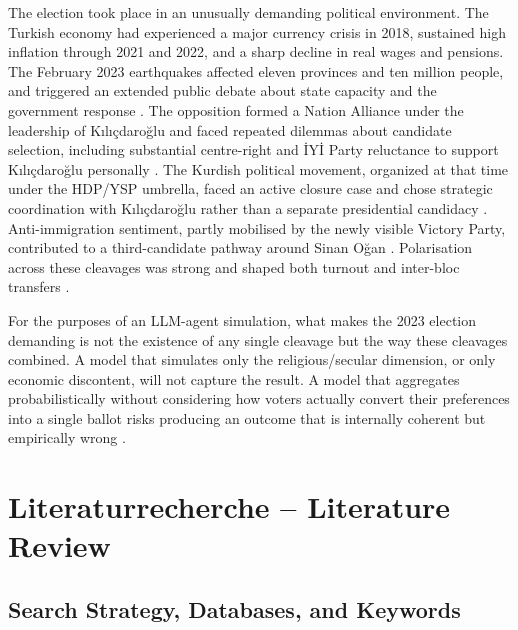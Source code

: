\documentclass[12pt,a4paper]{report}
\begin{document}
The election took place in an unusually demanding political environment. The Turkish economy had experienced a major currency crisis in 2018, sustained high inflation through 2021 and 2022, and a sharp decline in real wages and pensions. The February 2023 earthquakes affected eleven provinces and ten million people, and triggered an extended public debate about state capacity and the government response \citep{sevinc2024afet}. The opposition formed a Nation Alliance under the leadership of Kılıçdaroğlu and faced repeated dilemmas about candidate selection, including substantial centre-right and İYİ Party reluctance to support Kılıçdaroğlu personally \citep{baruh2024difficult}. The Kurdish political movement, organized at that time under the HDP/YSP umbrella, faced an active closure case and chose strategic coordination with Kılıçdaroğlu rather than a separate presidential candidacy \citep{ilbiz2023securitization,yegen2022kurdish}. Anti-immigration sentiment, partly mobilised by the newly visible Victory Party, contributed to a third-candidate pathway around Sinan Oğan \citep{gerim2025victory}. Polarisation across these cleavages was strong and shaped both turnout and inter-bloc transfers \citep{aytac2025polarised,carkoglu2024unlikely,cinkara2025erdogan}.

For the purposes of an LLM-agent simulation, what makes the 2023 election demanding is not the existence of any single cleavage but the way these cleavages combined. A model that simulates only the religious/secular dimension, or only economic discontent, will not capture the result. A model that aggregates probabilistically without considering how voters actually convert their preferences into a single ballot risks producing an outcome that is internally coherent but empirically wrong \citep{kang2026dynamok,kreutner2026ep}.

\chapter{Literaturrecherche -- Literature Review}
\label{ch:litreview}

\section{Search Strategy, Databases, and Keywords}
\label{sec:search_strategy}
\end{document}
